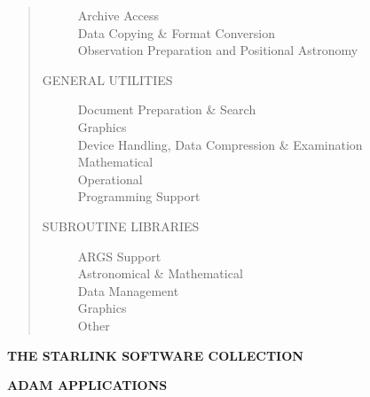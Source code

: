 \begin{quote}
\begin{description}
\begin{description}
\item [Archive Access] \mbox{}
\item [Data Copying \& Format Conversion] \mbox{}
\item [Observation Preparation and Positional Astronomy] \mbox{}
\end{description}

\item [GENERAL UTILITIES] \mbox{}

\begin{description}
\item [Document Preparation \& Search] \mbox{}
\item [Graphics] \mbox{}
\item [Device Handling, Data Compression \& Examination] \mbox{}
\item [Mathematical] \mbox{}
\item [Operational] \mbox{}
\item [Programming Support] \mbox{}
\end{description}

\item [SUBROUTINE LIBRARIES] \mbox{}

\begin{description}
\item [ARGS Support] \mbox{}
\item [Astronomical \& Mathematical] \mbox{}
\item [Data Management] \mbox{}
\item [Graphics] \mbox{}
\item [Other] \mbox{}
\end{description}

\end{description}
\end{quote}

\newpage
\normalsize

\begin{center}
{\LARGE\bf THE STARLINK SOFTWARE COLLECTION}
\end{center}


\begin{center}
{\bf\Large ADAM APPLICATIONS}
\end{center}

